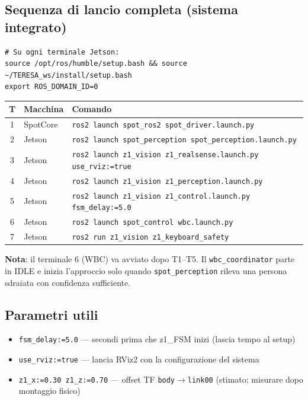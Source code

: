 \documentclass[a4paper,11pt]{article}
\begin{document}
\subsection*{Sequenza di lancio completa (sistema integrato)}

\begin{lstlisting}
# Su ogni terminale Jetson:
source /opt/ros/humble/setup.bash && source ~/TERESA_ws/install/setup.bash
export ROS_DOMAIN_ID=0
\end{lstlisting}

\begin{center}
\begin{tabular}{|c|l|p{7.5cm}|}
\hline
\textbf{T} & \textbf{Macchina} & \textbf{Comando} \\
\hline
1 & SpotCore & \texttt{ros2 launch spot\_ros2 spot\_driver.launch.py} \\
\hline
2 & Jetson & \texttt{ros2 launch spot\_perception spot\_perception.launch.py} \\
\hline
3 & Jetson & \texttt{ros2 launch z1\_vision z1\_realsense.launch.py use\_rviz:=true} \\
\hline
4 & Jetson & \texttt{ros2 launch z1\_vision z1\_perception.launch.py} \\
\hline
5 & Jetson & \texttt{ros2 launch z1\_vision z1\_control.launch.py fsm\_delay:=5.0} \\
\hline
6 & Jetson & \texttt{ros2 launch spot\_control wbc.launch.py} \\
\hline
7 & Jetson & \texttt{ros2 run z1\_vision z1\_keyboard\_safety} \\
\hline
\end{tabular}
\end{center}

\textbf{Nota}: il terminale 6 (WBC) va avviato dopo T1--T5.
Il \texttt{wbc\_coordinator} parte in IDLE e inizia l'approccio solo
quando \texttt{spot\_perception} rileva una persona sdraiata con confidenza sufficiente.

\subsection*{Parametri utili}

\begin{itemize}[leftmargin=1.5em]
  \item \texttt{fsm\_delay:=5.0} — secondi prima che z1\_FSM inizi (lascia tempo al setup)
  \item \texttt{use\_rviz:=true} — lancia RViz2 con la configurazione del sistema
  \item \texttt{z1\_x:=0.30 z1\_z:=0.70} — offset TF \texttt{body}$\to$\texttt{link00}
        (stimato; misurare dopo montaggio fisico)
\end{itemize}
\end{document}
